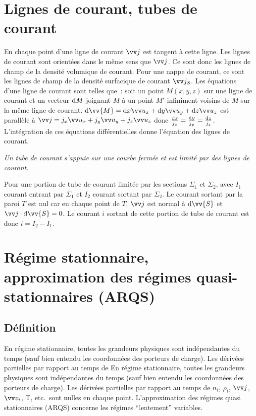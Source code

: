 \section{Lignes de courant, tubes de courant}%
\label{chap9-sec:lignesdecourant}%

En chaque point d'une ligne de courant \(\vj\) est tangent à  cette ligne. Les 
lignes de courant sont orientées dans le même sens que \(\vj\). Ce sont donc 
les lignes de champ de la densité volumique de courant. Pour une nappe de 
courant, ce sont les lignes de champ de la densité surfacique de courant 
\(\vj_S\).
Les équations d'une ligne de courant sont telles que~: soit un point 
\(M(x,y,z)\) sur une ligne de courant et un vecteur \(\mathrm{d} M\) joignant \(M\) à 
un point \(M'\) infiniment voisins de \(M\) sur la même ligne de courant.
\(\D \vv{M} = \D x \ux + \D y \uy + \D z \uz\) est parallèle à \(\vj = j_x \ux 
+ j_y \uy + j_z \uz\) donc \(\frac{\mathrm{d} x}{j_x} = \frac{\mathrm{d} y}{j_y} = \frac{\mathrm{d} 
z}{j_z}\). L'intégration de ces équations différentielles donne l'équation des 
lignes de courant.

\emph{Un tube de courant s'appuie sur une courbe fermée et est limité par des 
lignes de courant.}%

Pour une portion de tube de courant limitée par les sections \(\Sigma_1\) et 
\(\Sigma_2\), avec \(I_1\) courant entrant par \(\Sigma_1\) et \(I_2\) courant 
sortant par \(\Sigma_2\). Le courant sortant par la paroi \(T\) est nul car en 
chaque point de \(T\), \(\vj\) est normal à \(\D \vv{S}\) et \(\vj \cdot \D 
\vv{S} = 0\). Le courant \(i\) sortant de cette portion de tube de courant est 
donc \(i = I_2 - I_1\).

\section{Régime stationnaire, approximation des régimes quasi-stationnaires 
(ARQS)}%
\label{chap9-sec:ARQS}%

\subsection{Définition}%
\label{chap9-sec:def}%

En régime stationnaire, toutes les grandeurs physiques sont indépendantes du 
temps (sauf bien entendu les coordonnées des porteurs de charge). Les dérivées 
partielles par rapport au temps de En régime stationnaire, toutes les grandeurs 
physiques sont indépendantes du temps (sauf bien entendu les coordonnées des 
porteurs de charge).
Les dérivées partielles par rapport au temps de \(n_i\), \(\rho_i\), \(\vj\), 
\(\vvv_i\), T, etc.\ sont nulles en chaque point. L'approximation des régimes 
quasi stationnaires (ARQS) concerne les régimes ``lentement'' variables.

